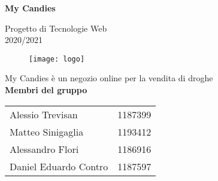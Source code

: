 \begin{titlepage}
   \begin{center}
        \vspace*{1cm}
    
        \vspace{0.3cm}
        \textbf{\huge My Candies}

        \vspace{0.3cm}
        Progetto di Tecnologie Web \\
        \vspace{0.3cm}
        2020/2021
        \vspace{0.3cm}
        \begin{figure}[H]
        \centering
        \texttt{[image: logo]}
        \end{figure}
        \vspace{0.3cm}
         My Candies è un negozio online per la vendita di droghe \\
        \vspace{1.0cm}
        \textbf{Membri del gruppo} \\
        \vspace{1.0cm}
        \begin{tabular}{lc}
        Alessio Trevisan      & 1187399 \\
        Matteo Sinigaglia     & 1193412 \\
        Alessandro Flori      & 1186916 \\
        Daniel Eduardo Contro & 1187597 \\
        \end{tabular} 
        \\
        \vspace{1.0cm}
        

\end{center}
\end{titlepage}
